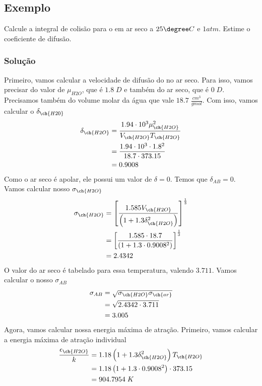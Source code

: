 \subsection{Exemplo}
Calcule a integral de colisão para o  em ar seco a \(25\degree C\) e \(1 atm\). Estime o
coeficiente de difusão.
\subsubsection{Solução}
Primeiro, vamos calcular a velocidade de difusão do  no ar seco. Para isso, vamos precisar
do valor de \(\mu_{H2O} \), que é \(1.8 \; D\) e também do ar seco, que é \(0 \; D\). Precisamos
também do volume molar da água que vale \(18.7 \; \frac{cm^{3}}{gmol}\). Com isso, vamos calcular o
\(\delta_{\ch{H20}}\)
\begin{align}
    \delta_{\ch{H2O}} &= \frac{1.94 \cdot 10^{3} \mu_{\ch{H2O}}^{2} }{V_{\ch{H2O}} T_{\ch{H2O}}  } \\
    &= \frac{1.94 \cdot 10^{3} \cdot 1.8^{2} }{18.7 \cdot 373.15} \\    
    &= 0.9008
\end{align}
Como o ar seco é apolar, ele possui um valor de \(\delta=0 \). Temos que \(\delta_{AB}=0 \). Vamos
calcular nosso \(\sigma_{\ch{H2O} }\)
\begin{align}
    \sigma_{\ch{H2O}} &= \left[ \frac{1.585 V_{\ch{H2O}} }{\left( 1 + 1.3 \delta_{\ch{H2O}} ^{2}\right) } \right]^{\frac{1}{3}} \\
    &= \left[ \frac{1.585 \cdot 18.7 }{\left( 1 + 1.3 \cdot 0.9008 ^{2}\right) } \right]^{\frac{1}{3}} \\
    &=  2.4342
\end{align}
O valor do ar seco é tabelado para essa temperatura, valendo \(3.711 \). Vamos calcular o nosso
\(\sigma_{AB} \)
\begin{align}
    \sigma_{AB} &= \sqrt{\sigma_{\ch{H2O}} \sigma_{\ch{ar}}} \\
    &= \sqrt{2.4342 \cdot 3.711} \\
    &= 3.005
\end{align}
Agora, vamos calcular nossa energia máxima de atração. Primeiro, vamos calcular a energia máxima de 
atração individual
\begin{align}
    \frac{\epsilon_{\ch{H2O}}}{k} &= 1.18 \left( 1 + 1.3 \delta_{\ch{H2O}} ^{2}  \right) T_{\ch{H2O}} \\
    &= 1.18 \left( 1 + 1.3 \cdot 0.9008 ^{2}  \right) \cdot 373.15 \\
    &= 904.7954 \; K
\end{align}
